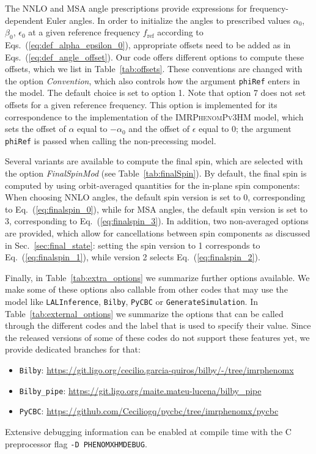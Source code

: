 \documentclass[%
aps,
prd,
amssymb,
amsmath,
amsfonts,
eqsecnum,
showpacs,
nofootinbib,
floatfix,
twocolumn,
twoside,
a4paper,
superscriptaddress
]{revtex4-1}
\newcommand{\phPvthreehm}{\textsc{IMRPhenomPv3HM}\xspace}
\begin{document}
The NNLO and MSA angle prescriptions provide expressions for frequency-dependent Euler angles. 
In order to initialize the angles to prescribed values $\alpha_0$, $\beta_0$, $\epsilon_0$
at a given reference frequency $f_\mathrm{ref}$
according to Eqs.~(\ref{eq:def_alpha_epsilon_0}), appropriate offsets need to be added as in Eqs.~(\ref{eq:def_angle_offset}).
Our code offers different options to compute these offsets, which we list in Table~\ref{tab:offsets}. These conventions are changed with the option \textit{Convention}, which also controls  how the argument \texttt{phiRef} enters in the model.  The default choice is set to option 1. Note that option 7 does not set offsets for a given reference frequency. This option is implemented for its correspondence to the implementation of the \phPvthreehm \cite{Khan:2019kot} model, which sets the offset of $\alpha$ equal to $-\alpha_0$ and the offset of $\epsilon$ equal to 0; the argument \texttt{phiRef} is passed when calling the non-precessing model.

Several variants are available to compute the final spin, which are selected with the option \textit{FinalSpinMod} (see Table~\ref{tab:finalSpin}). By default, the final spin is computed by using orbit-averaged quantities
for the in-plane spin components: When choosing NNLO angles, the default spin version is set to 0, corresponding to Eq.~(\ref{eq:finalspin_0}), while for MSA angles, the default spin version is set to 3, corresponding to Eq.~(\ref{eq:finalspin_3}). In addition, two non-averaged options are provided, which allow for cancellations between spin components as discussed in Sec.~\ref{sec:final_state}:
setting the spin version to 1 corresponds to  Eq.~(\ref{eq:finalspin_1}), while version 2 selects Eq.~(\ref{eq:finalspin_2}).

Finally, in Table~\ref{tab:extra_options} we summarize further options available.
We make some of these options also callable from other codes that may use the model like \texttt{LALInference}, \texttt{Bilby}, \texttt{PyCBC} or \texttt{GenerateSimulation}. In Table~\ref{tab:external_options} we summarize the options that can be called through the different codes and the label that is used to specify their value.
Since the released versions of some of these codes do not support these features yet, we provide dedicated branches for that:
\begin{itemize}
    \item \texttt{Bilby}:
    \url{https://git.ligo.org/cecilio.garcia-quiros/bilby/-/tree/imrphenomx}
    \item \texttt{Bilby\_pipe}:
    \url{https://git.ligo.org/maite.mateu-lucena/bilby_pipe}
    \item \texttt{PyCBC}:
    \url{https://github.com/Ceciliogq/pycbc/tree/imrphenomx/pycbc}
\end{itemize}
Extensive debugging information can be enabled at compile time with the C preprocessor flag {\tt -D PHENOMXHMDEBUG}.
\end{document}

